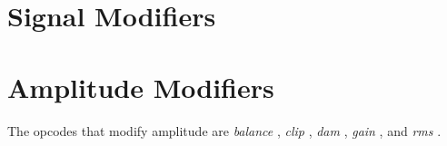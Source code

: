 \begin{comment}
\documentclass[10pt]{article}
\usepackage{fullpage, graphicx, url}
\setlength{\parskip}{1ex}
\setlength{\parindent}{0ex}
\title{Signal Modifiers}



\begin{tabular}{ccc}
The Alternative Csound Reference Manual & & \\
Previous & &Next

\end{tabular}

\end{comment}
\section{Signal Modifiers}
\section{Amplitude Modifiers}


  The opcodes that modify amplitude are \emph{balance}
, \emph{clip}
, \emph{dam}
, \emph{gain}
, and \emph{rms}
. 


\begin{comment}
\begin{tabular}{lcr}
Previous &Home &Next \\
Sound File Queries &Up &Convolution and Morphing

\end{tabular}



\end{comment}
